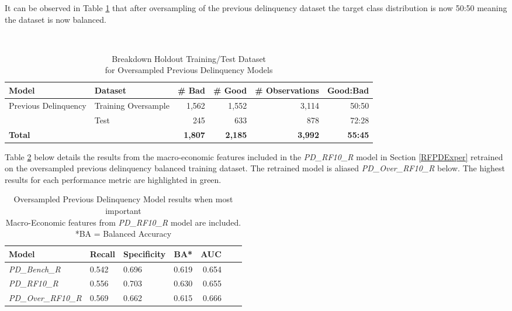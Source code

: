 It can be observed in Table \ref{table:oversample_train_testPD} that after oversampling of the previous delinquency dataset the target class distribution is now 50:50 meaning the dataset is now balanced.

\begin{table}[H]
	\centering\
	\resizebox{\textwidth}{!}
	{
		\begin{tabular}{l l r r r r}
			\hline
			\textbf{Model} &  \textbf{Dataset} & \textbf{\# Bad} & \textbf{\# Good} & \textbf{\# Observations} & \textbf{Good:Bad} \\
			\hline
			Previous Delinquency & Training Oversample & 1,562 & 1,552 & 3,114 & 50:50\\
			& Test & 245 & 633 & 878 & 72:28\\\hline
			\textbf{Total}     & & \textbf{1,807} & \textbf{2,185} & \textbf{3,992} & \textbf{55:45} \\
			\hline 
		\end{tabular}
	}
	\caption{Breakdown Holdout Training/Test Dataset \\for Oversampled Previous Delinquency Models}
	\label{table:oversample_train_testPD}
\end{table}

Table \ref{table:overPD} below details the results from the macro-economic features included in the \textit{PD\_RF10\_R} model in Section \ref{RFPDExper} retrained on the oversampled previous delinquency balanced training dataset. The retrained model is aliased \textit{PD\_Over\_RF10\_R} below. The highest results for each performance metric are highlighted in green.

\begin{table}[H]
	\centering
	\small
		\begin{tabular}{l l l r r r r}
			\hline
			\textbf{Model} & \textbf{Recall} & \textbf{Specificity} & \textbf{BA*} & \textbf{AUC}  \\ \hline
			\textit{PD\_Bench\_R} & 0.542 & 0.696 & 0.619 & 0.654 \\ \hline
			\textit{PD\_RF10\_R} & 0.556 & \cellcolor{green!25}0.703 & \cellcolor{green!25}0.630 & 0.655  \\ 
			\textit{PD\_Over\_RF10\_R}  & \cellcolor{green!25}0.569 & 0.662 & 0.615 & \cellcolor{green!25}0.666   \\ \hline
		\end{tabular}
	\caption{{Oversampled Previous Delinquency Model results when most important\\
			Macro-Economic features from \textit{PD\_RF10\_R} model are included.
			\\ *BA = Balanced Accuracy}}
	\label{table:overPD}
\end{table}

